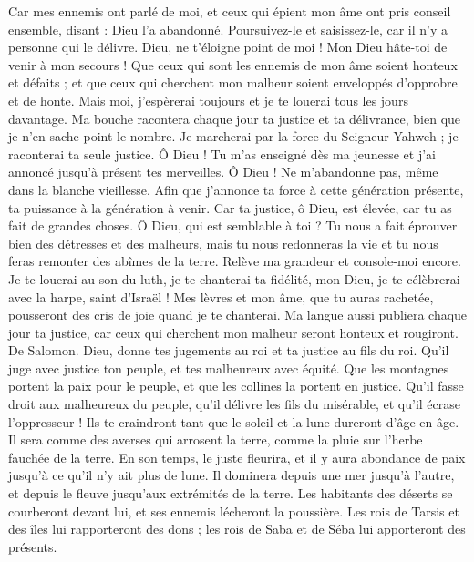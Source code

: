 \begin{multicols}{2}
Car mes ennemis ont parlé de moi, et ceux qui épient mon âme ont pris conseil ensemble,
disant : Dieu l'a abandonné. Poursuivez-le et saisissez-le, car il n'y a personne qui le délivre.
Dieu, ne t'éloigne point de moi ! Mon Dieu hâte-toi de venir à mon secours !
Que ceux qui sont les ennemis de mon âme soient honteux et défaits ; et que ceux qui cherchent mon malheur soient enveloppés d'opprobre et de honte.
Mais moi, j’espèrerai toujours et je te louerai tous les jours davantage.
Ma bouche racontera chaque jour ta justice et ta délivrance, bien que je n'en sache point le nombre.
Je marcherai par la force du Seigneur Yahweh ; je raconterai ta seule justice.
Ô Dieu ! Tu m'as enseigné dès ma jeunesse et j'ai annoncé jusqu’à présent tes merveilles.
Ô Dieu ! Ne m'abandonne pas, même dans la blanche vieillesse. Afin que j’annonce ta force à cette génération présente, ta puissance à la génération à venir.
Car ta justice, ô Dieu, est élevée, car tu as fait de grandes choses. Ô Dieu, qui est semblable à toi ?
Tu nous a fait éprouver bien des détresses et des malheurs, mais tu nous redonneras la vie et tu nous feras remonter des abîmes de la terre.
Relève ma grandeur et console-moi encore.
Je te louerai au son du luth, je te chanterai ta fidélité, mon Dieu, je te célèbrerai avec la harpe, saint d’Israël !
Mes lèvres et mon âme, que tu auras rachetée, pousseront des cris de joie quand je te chanterai.
Ma langue aussi publiera chaque jour ta justice, car ceux qui cherchent mon malheur seront honteux et rougiront.
\VerseOne{}De Salomon. Dieu, donne tes jugements au roi et ta justice au fils du roi.
Qu'il juge avec justice ton peuple, et tes malheureux avec équité.
Que les montagnes portent la paix pour le peuple, et que les collines la portent en justice.
Qu'il fasse droit aux malheureux du peuple, qu'il délivre les fils du misérable, et qu'il écrase l'oppresseur !
Ils te craindront tant que le soleil et la lune dureront d’âge en âge.
Il sera comme des averses qui arrosent la terre, comme la pluie sur l'herbe fauchée de la terre.
En son temps, le juste fleurira, et il y aura abondance de paix jusqu'à ce qu'il n'y ait plus de lune.
Il dominera depuis une mer jusqu'à l'autre, et depuis le fleuve jusqu'aux extrémités de la terre.
Les habitants des déserts se courberont devant lui, et ses ennemis lécheront la poussière.
Les rois de Tarsis et des îles lui rapporteront des dons ; les rois de Saba et de Séba lui apporteront des présents.

\end{multicols}
